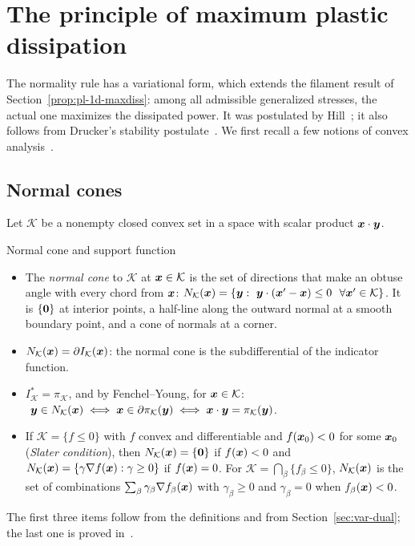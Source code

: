 \section{The principle of maximum plastic dissipation}\label{sec:pl-maxdiss}
%
The normality rule has a variational form, which extends the filament result
of Section~\ref{prop:pl-1d-maxdiss}: among all admissible generalized
stresses, the actual one maximizes the dissipated power. It was postulated by
Hill~\cite{Hill1950}; it also follows from Drucker's stability
postulate~\cite{Drucker1951,Lubliner1990}. We first recall a few notions of
convex analysis~\cite{RockafellarConvex}.

\subsection{Normal cones}\label{ssec:pl-cones}
%
Let $\mathcal K$ be a nonempty closed convex set in a space with scalar product
$\bm{x}\cdot\bm{y}$.
\begin{gbox}{Normal cone and support function}
\begin{itemize}
  \item The \emph{normal cone} to $\mathcal K$ at $\bm{x}\in \mathcal K$ is the set of directions
  that make an obtuse angle with every chord from $\bm{x}$:
  $N_{\mathcal K}(\bm{x})=\{\bm{y}:\ \bm{y}\cdot(\bm{x}'-\bm{x})\le0\ \ \forall\bm{x}'\in \mathcal K\}$. It is
  $\{\bm{0}\}$ at interior points, a half-line along the outward normal at a
  smooth boundary point, and a cone of normals at a corner.
  \item $N_{\mathcal K}(\bm{x})=\partial I_{\mathcal K}(\bm{x})$: the normal cone is the subdifferential
  of the indicator function.
  \item $I_{\mathcal K}^\ast=\pi_{\mathcal K}$, and by Fenchel--Young, for $\bm{x}\in \mathcal K$:
  $\ \bm{y}\in N_{\mathcal K}(\bm{x})\iff\bm{x}\in\partial\pi_{\mathcal K}(\bm{y})\iff\bm{x}\cdot\bm{y}=\pi_{\mathcal K}(\bm{y})$.
  \item If $\mathcal K=\{f\le0\}$ with $f$ convex and differentiable and $f(\bm{x}_0)<0$ for
  some $\bm{x}_0$ (\emph{Slater condition}), then $N_{\mathcal K}(\bm{x})=\{\bm{0}\}$ if
  $f(\bm{x})<0$ and $N_{\mathcal K}(\bm{x})=\{\gamma\nabla f(\bm{x}):\gamma\ge0\}$ if $f(\bm{x})=0$.
  For $\mathcal K=\bigcap_\beta\{f_\beta\le0\}$, $N_{\mathcal K}(\bm{x})$ is the set of combinations
  $\sum_\beta\gamma_\beta\nabla f_\beta(\bm{x})$ with $\gamma_\beta\ge0$ and
  $\gamma_\beta=0$ when $f_\beta(\bm{x})<0$.
\end{itemize}
\end{gbox}
The first three items follow from the definitions and from
Section~\ref{sec:var-dual}; the last one is proved
in~\cite[Sec.~23]{RockafellarConvex}.

